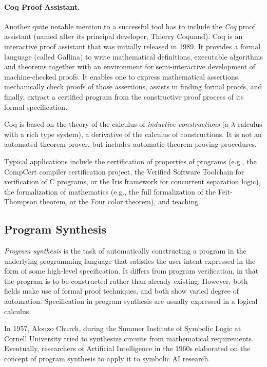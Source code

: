\paragraph{Coq Proof Assistant.}
Another quite notable mention to a successful tool has to include the \emph{Coq} proof assistant \cite{article:2013:Mohring} (named after its principal developer, Thierry Coquand). Coq is an interactive proof assistant that was initially released in 1989. It provides a formal language (called Gallina) to write mathematical definitions, executable algorithms and theorems together with an environment for semi-interactive development of machine-checked proofs. It enables one to express mathematical assertions, mechanically check proofs of those assertions, assists in finding formal proofs, and finally, extract a certified program from the constructive proof process of its formal specification.

Coq is based on the theory of the calculus of \emph{inductive constructions} (a $\lambda$-calculus with a rich type system), a derivative of the calculus of constructions. It is not an automated theorem prover, but includes automatic theorem proving procedures.

Typical applications include the certification of properties of programs (e.g., the CompCert compiler certification project, the Verified Software Toolchain for verification of C programs, or the Iris framework for concurrent separation logic), the formalization of mathematics (e.g., the full formalization of the Feit-Thompson theorem, or the Four color theorem), and teaching.


\subsection{Program Synthesis}

\emph{Program synthesis} is the task of automatically constructing a program in the underlying programming language that satisﬁes the user intent expressed in the form of some high-level speciﬁcation. It differs from program verification, in that the program is to be constructed rather than already existing. However, both fields make use of formal proof techniques, and both show varied degree of automation. Specification in program synthesis are usually expressed in a logical calculus.

In 1957, Alonzo Church, during the Summer Institute of Symbolic Logic at Cornell University tried to synthesize circuits from mathematical requirements. Eventually, researchers of Artificial Intelligence in the 1960s elaborated on the concept of program synthesis to apply it to symbolic AI research.

